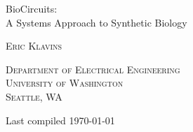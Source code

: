 \documentclass[10pt]{amsbook}
\begin{document}
%
%
\frontmatter

\begin{titlepage}
\begin{center}

\vspace{1in}

{\Huge\textsf{BioCircuits:\\
\vspace{0.25in}
A Systems Approach to Synthetic Biology}}

\vspace{1in}

\textsc{Eric Klavins}

\vspace{0.25in}

\textsc{Department of Electrical Engineering\\
University of Washington\\
Seattle, WA}

\vfill
 
Last compiled {\large \today}

\end{center}
\end{titlepage}

\setcounter{page}{4}

\tableofcontents

\mainmatter






















\appendix


\backmatter


\end{document}
